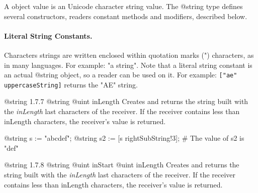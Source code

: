 

A  object value is an Unicode character string value. The @string type defines several constructors, readers constant methods and modifiers, described below.

\paragraph{Literal String Constants.}

Characters strings are written enclosed within quotation marks (") characters, as in many languages. For example: "a string". Note that a literal string constant is an actual @string object, so a reader can be used on it. For example: \lstinline[language=galgas]{["ae" uppercaseString]} returns the "AE" string.

{@string}
{1.7.7}
{@string}
{@uint inLength}
{Creates and returns the string built with the \emph{inLength} last characters of the receiver. If the receiver contains less than inLength characters, the receiver’s value is returned.}
{}

\begin{exemple}
@string s := "abcdef";
@string s2 := [s rightSubString!3]; # The value of s2 is "def"
\end{exemple}

{@string}
{1.7.8}
{@string}
{@uint inStart}
{@uint inLength}
{Creates and returns the string built with the \emph{inLength} last characters of the receiver. If the receiver contains less than inLength characters, the receiver’s value is returned.}
{}



